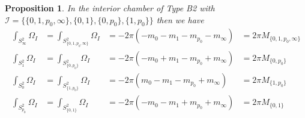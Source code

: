 \documentclass[12pt,letterpaper,reqno]{amsart}
\newtheorem{prop}[thm]{Proposition}
\theoremstyle{remark}
\theoremstyle{definition}
\numberwithin{thm}{section}
\numberwithin{equation}{section}
\numberwithin{figure}{section}
\begin{document}
\begin{prop}\label{prop:interiorintersection} 
In the interior chamber of Type B2 with $\mathcal{I}=\{\{0, 1, p_0, \infty\}, \{0, 1\}, \{0, p_0\}, \{1, p_0\}\}$ then we have  
\begin{equation}
\begin{array}{llll}
\int_{S^2_\infty} \Omega_I &=\int_{S^2_{\{0, 1, p_0, \infty \}}} \Omega_I &= -2 \pi (-m_0 - m_1 - m_{p_0}- m_\infty)&=2 \pi M_{\{0, 1, p_0, \infty\}}\\
\int_{S^2_1}  \Omega_I&= \int_{S^2_{\{0, p_0\}}} \Omega_I &= -2 \pi (-m_0 +m_1 - m_{p_0}+ m_\infty)&=2 \pi M_{\{0,p_0\}}\\
\int_{S^2_0}  \Omega_I&=\int_{S^2_{\{1, p_0\}}} \Omega_I &= -2\pi (m_0 -m_1 - m_{p_0}+ m_\infty)&=2 \pi M_{\{1,p_0\}}\\
\int_{S^2_{p_0}}  \Omega_I&=\int_{S^2_{\{0, 1\}}} \Omega_I &= -2 \pi (-m_0 -m_1 + m_{p_0}+ m_\infty)&= 2 \pi M_{\{0,1\}}
\end{array}
\end{equation}
\end{prop}
\end{document}
